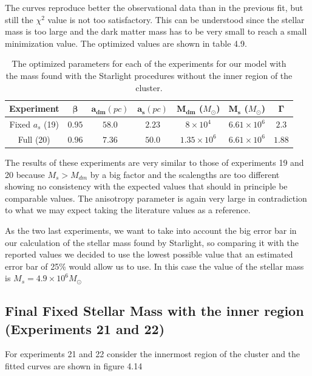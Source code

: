 The curves reproduce better the observational data than in the previous fit, but still the $\chi^{2}$ value is not too satisfactory. This can be understood since the stellar mass is too large and the dark matter mass has to be very small to reach a small minimization value. The optimized values are shown in table 4.9.

\begin{table}[]
\centering
\begin{tabular}{| c| c| c| c| c| c| c|}
    \hline
    \textbf{Experiment} & $\mathbf{\beta}$ & $\mathbf{a_{dm}} (pc)$ & $\mathbf{a_{s}} (pc)$ & $\mathbf{M_{dm}}$ ($M_{\odot}$) & $\mathbf{M_{s}}$ ($M_{\odot}$) & $\mathbf{\Gamma}$\\ \hline
	Fixed $a_s$ (19) &	$0.95$ &	$58.0$ &	$2.23$ &	$8 \times 10^{4}$ &	$6.61 \times 10 ^{6}$ &	$2.3$\\ \hline
	Full (20) &	$0.96$ &	$7.36$ &	$50.0$ &	$1.35 \times 10^{6}$ &	$6.61 \times 10^{6}$ &	$1.88$\\ \hline
  \end{tabular} 
\caption[Optimized parameters for our model with the mass found with the Starlight procedures without the inner region.]{The optimized parameters for each of the experiments for our model with the mass found with the Starlight procedures without the inner region of the cluster.}
\end{table}

The results of these experiments are very similar to those of experiments 19 and 20 because $M_{s}>M_{dm}$ by a big factor and the scalengths are too different showing no consistency with the expected values that should in principle be comparable values. The anisotropy parameter is again very large in contradiction to what we may expect taking the literature values as a reference.

As the two last experiments, we want to take into account the big error bar in our calculation of the stellar mass found by Starlight, so comparing it with the reported values we decided to use the lowest possible value that an estimated error bar of 25\% would allow us to use. In this case the value of the stellar mass is $M_{s}=4.9 \times 10^{6} M_{\odot}$

\subsection{Final Fixed Stellar Mass with the inner region (Experiments 21 and 22)}

For experiments 21 and 22 consider the innermost region of the cluster and the fitted curves are shown in figure 4.14

